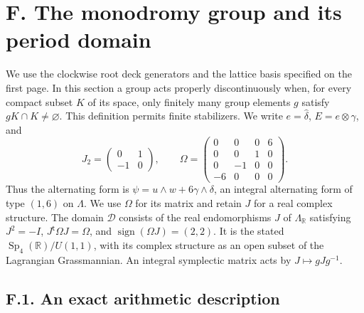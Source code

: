 \section{F. The monodromy group and its period domain}

We use the clockwise root deck generators and the lattice basis specified
on the first page.  In this section a group acts properly discontinuously when, for every
compact subset $K$ of its space, only finitely many group elements $g$ satisfy
$gK\cap K\ne\varnothing$.  This definition permits finite stabilizers.  We
write $e=\widehat\delta$, $E=e\otimes\gamma$, and
\[
 J_2=\begin{pmatrix}0&1\\-1&0\end{pmatrix},\qquad
 \Omega=\begin{pmatrix}
 0&0&0&6\\0&0&1&0\\0&-1&0&0\\-6&0&0&0
 \end{pmatrix}.
\]
Thus the alternating form is
$\psi=u\wedge w+6\gamma\wedge\delta$, an integral alternating form of
type $(1,6)$ on $\Lambda$.  We use $\Omega$ for its matrix and retain $J$ for
a real complex structure.  The domain $\mathcal D$ consists of the real
endomorphisms $J$ of $\Lambda_{\mathbb R}$ satisfying
$J^2=-I$, $J^{\mathsf t}\Omega J=\Omega$, and
$\operatorname{sign}(\Omega J)=(2,2)$.  It is the stated
$\operatorname{Sp}_4(\mathbb R)/U(1,1)$, with its complex structure as an
open subset of the Lagrangian Grassmannian.  An integral symplectic matrix
acts by $J\mapsto gJg^{-1}$.

\subsection{F.1. An exact arithmetic description}

